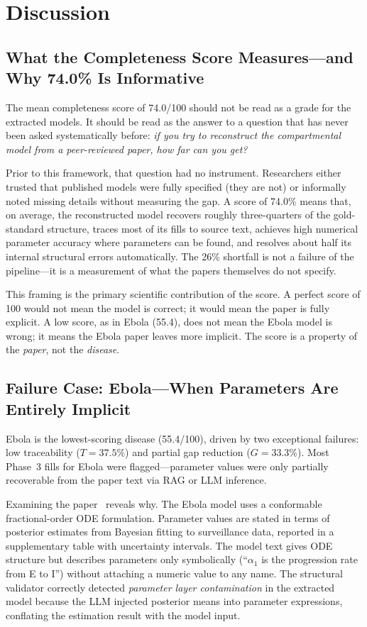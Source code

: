 \section{Discussion}
\label{sec:discussion}

\subsection{What the Completeness Score Measures---and Why 74.0\% Is Informative}

The mean completeness score of 74.0/100 should not be read as a grade for the extracted
models. It should be read as the answer to a question that has never been asked
systematically before: \emph{if you try to reconstruct the compartmental model from a
peer-reviewed paper, how far can you get?}

Prior to this framework, that question had no instrument. Researchers either trusted
that published models were fully specified (they are not) or informally noted missing
details without measuring the gap. A score of 74.0\% means that, on average, the
reconstructed model recovers roughly three-quarters of the gold-standard structure,
traces most of its fills to source text, achieves high numerical parameter accuracy where
parameters can be found, and resolves about half its internal structural errors
automatically. The 26\% shortfall is not a failure of the pipeline---it is a measurement
of what the papers themselves do not specify.

This framing is the primary scientific contribution of the score. A perfect score of 100
would not mean the model is correct; it would mean the paper is fully explicit. A low
score, as in Ebola (55.4), does not mean the Ebola model is wrong; it means the Ebola
paper leaves more implicit. The score is a property of the \emph{paper}, not the
\emph{disease}.

\subsection{Failure Case: Ebola---When Parameters Are Entirely Implicit}

Ebola is the lowest-scoring disease (55.4/100), driven by two exceptional failures:
low traceability ($T = 37.5\%$) and partial gap reduction ($G = 33.3\%$). Most
Phase~3 fills for Ebola were flagged---parameter values were only partially recoverable from
the paper text via RAG or LLM inference.

Examining the paper~\cite{Abbas2024Ebola} reveals why. The Ebola model uses a
conformable fractional-order ODE formulation. Parameter values are stated in terms of
posterior estimates from Bayesian fitting to surveillance data, reported in a
supplementary table with uncertainty intervals. The model text gives ODE structure but
describes parameters only symbolically (``$\alpha_1$ is the progression rate from E to I'')
without attaching a numeric value to any name. The structural validator correctly detected
\emph{parameter layer contamination} in the extracted model because the LLM injected
posterior means into parameter expressions, conflating the estimation result with the
model input.

